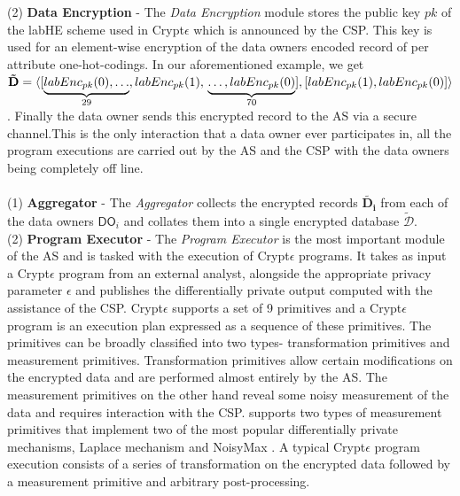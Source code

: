 (2)\textbf{ Data Encryption} - The \textit{Data Encryption} module stores the public key $pk$ of the labHE scheme used in Crypt$\epsilon$ which is announced by the CSP. This key is used for an element-wise encryption of the data owners encoded record of per attribute one-hot-codings. In our aforementioned example, we get $\mathbf{\tilde{D}}=\langle[\underbrace{labEnc_{pk}(0),\ldots}_{29},labEnc_{pk}(1),\\\underbrace{\ldots,labEnc_{pk}(0)}_{70}],
[labEnc_{pk}(1),labEnc_{pk}(0)]\rangle$. Finally the data owner sends this encrypted record to the \textsf{AS} via a secure channel.This is the only interaction that a data owner ever participates in, all the program executions are carried out by the \textsf{AS} and the \textsf{CSP} with the data owners being completely off line.\\
\\
(1)\textbf{  Aggregator} - The \textit{Aggregator} collects the encrypted records $\mathbf{\tilde{D_i}}$ from each of the data owners $\textsf{DO}_i$ and collates them into a single encrypted database $\boldsymbol{\tilde{\mathcal{D}}}$. %
\\(2)\textbf{ Program Executor }- The \textit{Program Executor} is the most important module of the \textsf{AS} and is tasked with the execution of Crypt$\epsilon$ programs. It takes as input a Crypt$\epsilon$ program from an external analyst, alongside the appropriate privacy parameter $\epsilon$ and publishes the differentially private output computed with the assistance of the \textsf{CSP}. Crypt$\epsilon$ supports a set of 9 primitives and a Crypt$\epsilon$ program is an execution plan expressed as a sequence of these primitives. The primitives can be broadly classified into two types- transformation primitives and measurement primitives. Transformation primitives allow certain modifications on the encrypted data and are performed almost entirely by the \textsf{AS}. The measurement primitives on the other hand reveal some noisy measurement of the data and requires interaction with the \textsf{CSP}. \system supports two types of measurement primitives that implement two of the most popular differentially private mechanisms, Laplace mechanism \cite{Dork} and NoisyMax \cite{Dork}. A typical Crypt$\epsilon$ program execution consists of  a series of transformation on the encrypted data followed by a measurement primitive and arbitrary post-processing. \\
